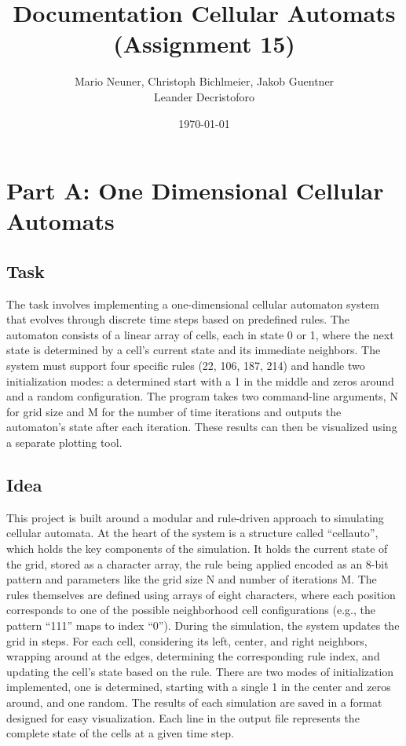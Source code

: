 \documentclass[12pt,a4paper]{article}
\title{\textbf{Documentation Cellular Automats (Assignment 15)}}
\author{Mario Neuner, Christoph Bichlmeier, Jakob Guentner\\Leander Decristoforo}
\date{\today}
\begin{document}
\maketitle
\vspace{5cm}
\tableofcontents
\pagebreak


\section{Part A: One Dimensional Cellular Automats}
\vspace{1cm}


\subsection{Task}
The task involves implementing a one-dimensional cellular automaton system that 
evolves through discrete time steps based on predefined rules. The automaton consists 
of a linear array of cells, each in state 0 or 1, where the next state is determined by 
a cell's current state and its immediate neighbors. The system must support four specific 
rules (22, 106, 187, 214) and handle two initialization modes: a determined start with a 1 
in the middle and zeros around and a random configuration. The program takes two command-line 
arguments, N for grid size and M for the number of time iterations and outputs the automaton's 
state after each iteration. These results can then be visualized using a separate plotting tool.
\newline

\vspace{1cm}


\subsection{Idea}
This project is built around a modular and rule-driven approach to simulating cellular automata. 
At the heart of the system is a structure called “cellauto”, which holds the key components of the 
simulation. It holds the current state of the grid, stored as a character array, the rule being applied 
encoded as an 8-bit pattern and parameters like the grid size N and number of iterations M.
\newline
The rules themselves are defined using arrays of eight characters, where each position corresponds to 
one of the possible neighborhood cell configurations (e.g., the pattern “111” maps to index “0”). During 
the simulation, the system updates the grid in steps. For each cell, considering its left, center, and right 
neighbors, wrapping around at the edges, determining the corresponding rule index, and updating the cell’s 
state based on the rule.
\newline
There are two modes of initialization implemented, one is determined, starting with a 
single 1 in the center and zeros around, and one random. 
The results of each simulation are saved in a format designed for easy visualization. 
Each line in the output file represents the complete state of the cells at a given time step.
\newline
\end{document}
